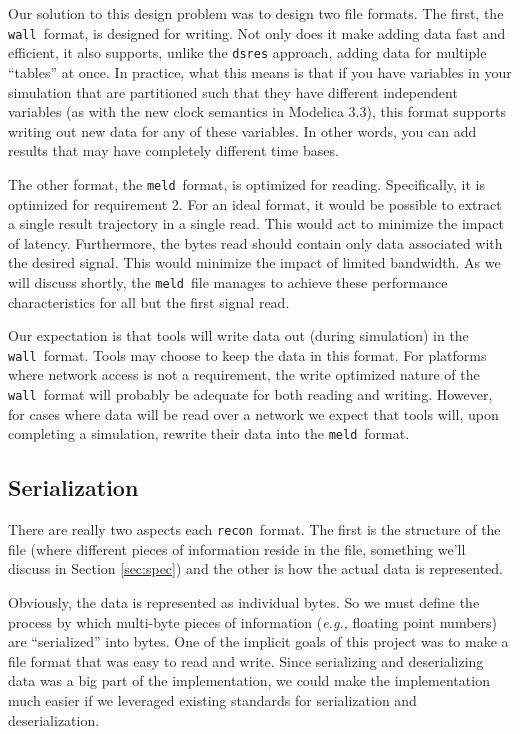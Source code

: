 \documentclass[11pt,a4paper,twocolumn]{article}
\newcommand{\recon}{\texttt{recon}}
\newcommand{\wall}{\texttt{wall}}
\newcommand{\meld}{\texttt{meld}}
\newcommand{\code}[1]{\texttt{#1}} %
\begin{document}

Our solution to this design problem was to design two file formats.
The first, the \wall\ format, is designed for writing.  Not only does
it make adding data fast and efficient, it also supports, unlike the
\code{dsres} approach, adding data for multiple ``tables'' at once.
In practice, what this means is that if you have variables in your
simulation that are partitioned such that they have different
independent variables (as with the new clock semantics in Modelica
3.3), this format supports writing out new data for any of these
variables.  In other words, you can add results that may have
completely different time bases.

The other format, the \meld\ format, is optimized for reading.
Specifically, it is optimized for requirement 2.  For an ideal
format, it would be possible to extract a single result trajectory in
a single read.  This would act to minimize the impact of latency.
Furthermore, the bytes read should contain only data associated with
the desired signal.  This would minimize the impact of limited
bandwidth.  As we will discuss shortly, the \meld\ file manages to
achieve these performance characteristics for all but the first signal
read.

Our expectation is that tools will write data out (during simulation)
in the \wall\ format.  Tools may choose to keep the data in this
format.  For platforms where network access is not a requirement, the
write optimized nature of the \wall\ format will probably be adequate
for both reading and writing.  However, for cases where data will be
read over a network we expect that tools will, upon completing a
simulation, rewrite their data into the \meld\ format.

\subsection{Serialization}


There are really two aspects each \recon\ format.  The first is the
structure of the file (where different pieces of information reside in
the file, something we'll discuss in Section \ref{sec:spec}) and the
other is how the actual data is represented.

Obviously, the data is represented as individual bytes.  So we must
define the process by which multi-byte pieces of information
(\textit{e.g.,} floating point numbers) are ``serialized'' into bytes.
One of the implicit goals of this project was to make a file format
that was easy to read and write.  Since serializing and deserializing
data was a big part of the implementation, we could make the
implementation much easier if we leveraged existing standards for
serialization and deserialization.
\end{document}
